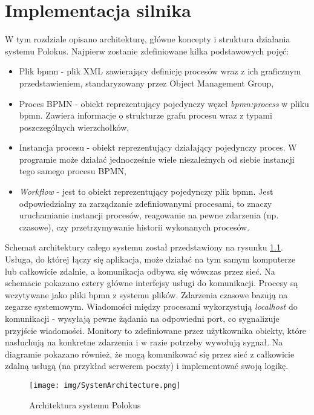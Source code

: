 \documentclass[declaration,shortabstract,mgr]{iithesis}
\newcommand{\bpmn}{BPMN }
\newcommand{\bpmnnospace}{BPMN}
\begin{document}
\chapter{Implementacja silnika}\label{chapter-implementation}
W tym rozdziale opisano architekturę, główne koncepty i struktura działania systemu Polokus. Najpierw zostanie zdefiniowane kilka podstawowych pojęć:
\begin{itemize}
    \setlength\itemsep{0em}
    \item Plik bpmn - plik XML zawierający definicję procesów wraz z ich graficznym przedstawieniem, standaryzowany przez Object Management Group,
    \item Proces \bpmn - obiekt reprezentujący pojedynczy węzeł \emph{bpmn:process} w pliku bpmn. Zawiera informacje o strukturze grafu procesu wraz z typami poszczególnych wierzchołków,
    \item Instancja procesu - obiekt reprezentujący działający pojedynczy proces. W programie może działać jednocześnie wiele niezależnych od siebie instancji tego samego procesu \bpmnnospace,
    \item \textit{Workflow} - jest to obiekt reprezentujący pojedynczy plik bpmn. Jest odpowiedzialny za zarządzanie zdefiniowanymi procesami, to znaczy uruchamianie instancji procesów, reagowanie na pewne zdarzenia (np. czasowe), czy przetrzymywanie historii  wykonanych procesów.
\end{itemize}

Schemat architektury całego systemu został przedstawiony na rysunku \ref{fig:polokus-architecture}. Usługa, do której łączy się aplikacja, może działać na tym samym komputerze lub całkowicie zdalnie, a komunikacja odbywa się wówczas przez sieć. Na schemacie pokazano cztery główne interfejsy usługi do komunikacji. Procesy są wczytywane jako pliki bpmn z systemu plików. Zdarzenia czasowe bazują na zegarze systemowym. Wiadomości między procesami wykorzystują \textit{localhost} do komunikacji - wysyłają pewne żądania na odpowiedni port, co sygnalizuje przyjście wiadomości. Monitory to zdefiniowane przez użytkownika obiekty, które nasłuchują na konkretne zdarzenia i w razie potrzeby wywołują sygnał. Na diagramie pokazano również, że mogą komunikować się przez sieć z całkowicie zdalną usługą (na przykład serwerem poczty) i implementować swoją logikę.

\begin{figure}
    \texttt{[image: img/SystemArchitecture.png]}
    \caption{Architektura systemu Polokus}
    \label{fig:polokus-architecture}
\end{figure}
\end{document}
